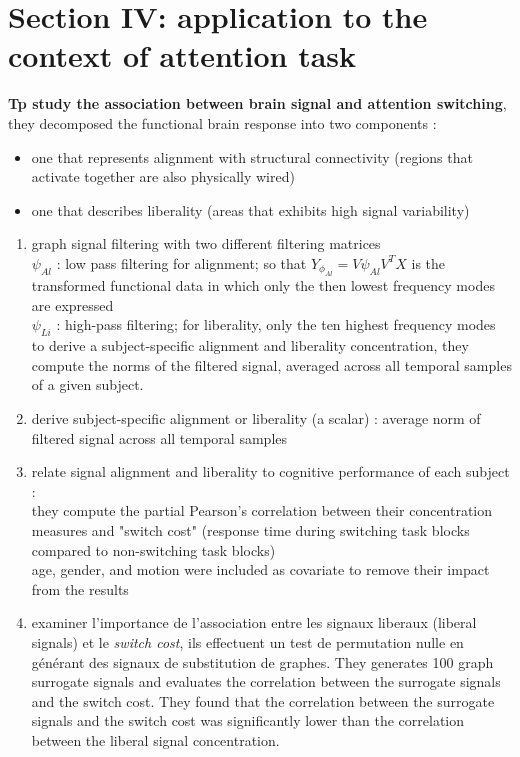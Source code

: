 \documentclass[12pt]{article}
\begin{document}
\section{Section IV: application to the context of attention task}
\textbf{Tp study the association between brain signal and attention switching}, they decomposed the functional brain response into two components : 
\begin{itemize}
    \item one that represents alignment with structural connectivity (regions that activate together are also physically wired)
    \item one that describes liberality (areas that exhibits high signal variability)
\end{itemize}
\begin{enumerate}
    \item graph signal filtering with two different filtering matrices \\
            $\psi_{Al}$ : low pass filtering for alignment; so that $Y_{\phi_{Al}} = V\psi_{Al}V^TX$ is the transformed functional data in which only the then lowest frequency modes are expressed \\
            $\psi_{Li}$ : high-pass filtering; for liberality, only the ten highest frequency modes \\ 
            to derive a subject-specific alignment and liberality concentration, they compute the norms of the filtered signal, averaged across all temporal samples of a given subject. 
    \item derive subject-specific alignment or liberality (a scalar) : average norm of filtered signal across all temporal samples
    \item relate signal alignment and liberality to cognitive performance of each subject : \\
            they compute the partial Pearson's correlation between their concentration measures and "switch cost" (response time during switching task blocks compared to non-switching task blocks) \\ 
            age, gender, and motion were included as covariate to remove their impact from the results  
    \item examiner l'importance de l'association entre les signaux liberaux (liberal signals) et le \textit{switch cost}, ils effectuent un test de permutation nulle en générant des signaux de substitution de graphes.  
            They generates 100 graph surrogate signals and evaluates the correlation between the surrogate signals and the switch cost. They found that the correlation between the surrogate signals and the switch cost was significantly lower than the correlation between the liberal signal concentration.
\end{enumerate}
\end{document}
